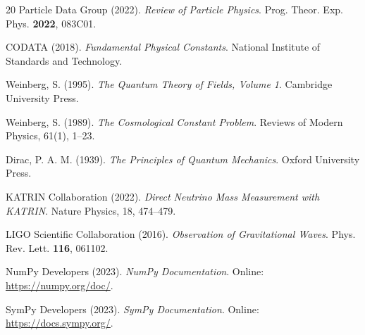 \begin{thebibliography}{20}
Particle Data Group (2022). 
\textit{Review of Particle Physics}. 
Prog. Theor. Exp. Phys. \textbf{2022}, 083C01.

CODATA (2018). 
\textit{Fundamental Physical Constants}. 
National Institute of Standards and Technology.

Weinberg, S. (1995). 
\textit{The Quantum Theory of Fields, Volume 1}. 
Cambridge University Press.

Weinberg, S. (1989). 
\textit{The Cosmological Constant Problem}. 
Reviews of Modern Physics, 61(1), 1--23.

Dirac, P. A. M. (1939). 
\textit{The Principles of Quantum Mechanics}. 
Oxford University Press.

KATRIN Collaboration (2022). 
\textit{Direct Neutrino Mass Measurement with KATRIN}. 
Nature Physics, 18, 474--479.

LIGO Scientific Collaboration (2016). 
\textit{Observation of Gravitational Waves}. 
Phys. Rev. Lett. \textbf{116}, 061102.

NumPy Developers (2023). 
\textit{NumPy Documentation}. 
Online: \url{https://numpy.org/doc/}.

SymPy Developers (2023). 
\textit{SymPy Documentation}. 
Online: \url{https://docs.sympy.org/}.

\end{thebibliography}
